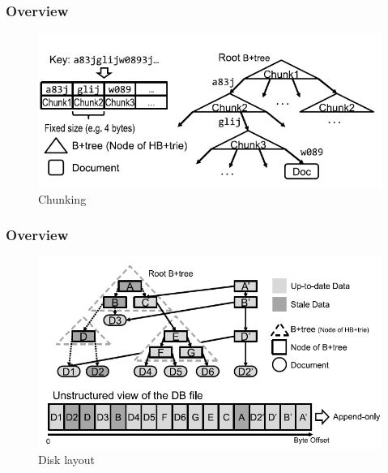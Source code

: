 \documentclass[aspectratio=169]{beamer}
\begin{document}
\begin{frame}[t]
	\frametitle{Overview}
	\begin{figure}[h!]
		\includegraphics[scale=0.7]{logical_layout}
		\caption{Chunking}
	\end{figure}
	\centering	
\end{frame}
\begin{frame}[t]
	\frametitle{Overview}
	\begin{figure}[h!]
		\includegraphics[scale=0.5]{disk_layout}
		\caption{Disk layout}
	\end{figure}
	\centering	
\end{frame}
\end{document}
